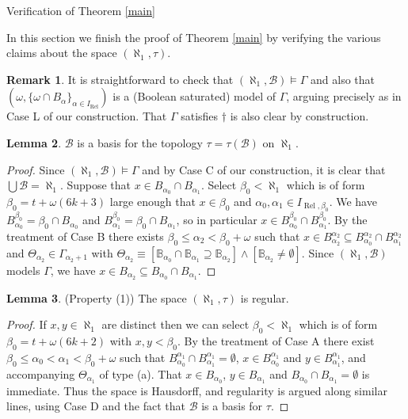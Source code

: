 \documentclass{amsart}
\theoremstyle{definition}\newtheorem{theorem}{Theorem}
\theoremstyle{definition}\newtheorem{bigtheorem}{Theorem}
\numberwithin{theorem}{section}
\theoremstyle{definition}\newtheorem{corollary}[theorem]{Corollary}
\theoremstyle{definition}\newtheorem{proposition}[theorem]{Proposition}
\theoremstyle{definition}\newtheorem{definition}[theorem]{Definition}
\theoremstyle{definition}\newtheorem{question}[theorem]{Question}
\theoremstyle{definition}\newtheorem{example}[theorem]{Example}
\theoremstyle{definition}\newtheorem{remark}[theorem]{Remark}
\theoremstyle{definition}\newtheorem{note}[theorem]{Note}
\theoremstyle{definition}\newtheorem{lemma}[theorem]{Lemma}
\theoremstyle{definition}\newtheorem{fact}[theorem]{Fact}
\theoremstyle{definition}\newtheorem{define}[theorem]{Definition}
\theoremstyle{definition}\newtheorem{definitions}[theorem]{Definitions}
\theoremstyle{definition}\newtheorem{claim}[theorem]{Claim}
\theoremstyle{definition}\newtheorem{obs}[theorem]{Observation}
\theoremstyle{definition}\newtheorem{construction}[theorem]{Construction}
\newcommand{\B}{\mathbb{B}}
\newcommand{\Rel}{\operatorname{Rel}}
\newcommand{\Bo}{\mathcal{B}}
\begin{document}
\begin{section}{Verification of Theorem \ref{main}}\label{verification}



In this section we finish the proof of Theorem \ref{main} by verifying the various claims about the space $(\aleph_1, \tau)$.  

\begin{remark}\label{modelindeed}  It is straightforward to check that $(\aleph_1, \Bo) \models \Gamma$ and also that $(\omega, \{\omega \cap B_{\alpha}\}_{\alpha \in I_{\Rel}})$ is a (Boolean saturated) model of $\Gamma$, arguing precisely as in Case L of our construction.  That $\Gamma$ satisfies $\dagger$ is also clear by construction.
\end{remark}

\begin{lemma}\label{basisindeed}  $\Bo$ is a basis for the topology $\tau = \tau(\Bo)$ on $\aleph_1$.  
\end{lemma}

\begin{proof}  Since $(\aleph_1, \Bo) \models \Gamma$ and by Case C of our construction, it is clear that $\bigcup \Bo = \aleph_1$. Suppose that $x \in B_{\alpha_0} \cap B_{\alpha_1}$.  Select $\beta_0 < \aleph_1$ which is of form $\beta_0 = t + \omega(6k + 3)$ large enough that $x \in \beta_0$ and $\alpha_0, \alpha_1 \in  I_{\Rel, \beta_0}$.  We have $B_{\alpha_0}^{\beta_0} = \beta_0 \cap B_{\alpha_0}$ and $B_{\alpha_1}^{\beta_0} = \beta_0 \cap B_{\alpha_1}$, so in particular $x\in  B_{\alpha_0}^{\beta_0} \cap B_{\alpha_1}^{\beta_0}$.  By the treatment of Case B there exists $\beta_0 \leq \alpha_2 < \beta_0 + \omega$ such that $x \in B_{\alpha_2}^{\alpha_2} \subseteq B_{\alpha_0}^{\alpha_2} \cap B_{\alpha_1}^{\alpha_2}$ and $\Theta_{\alpha_2}\in \Gamma_{\alpha_2 + 1}$ with $\Theta_{\alpha_2} \equiv [\B_{\alpha_0} \cap \B_{\alpha_1} \supseteq \B_{\alpha_2}]\wedge [\B_{\alpha_2} \neq \emptyset]$.  Since $(\aleph_1, \Bo)$ models $\Gamma$, we have $x\in B_{\alpha_2} \subseteq B_{\alpha_0}\cap B_{\alpha_1}$.
\end{proof}

\begin{lemma}\label{regularindeed}(Property (1))  The space $(\aleph_1, \tau)$ is regular.
\end{lemma}

\begin{proof}  If $x, y \in \aleph_1$ are distinct then we can select $\beta_0 < \aleph_1$ which is of form $\beta_0 = t + \omega(6k + 2)$ with $x, y < \beta_0$.  By the treatment of Case A there exist $\beta_0 \leq \alpha_0 < \alpha_1 <\beta_0 + \omega$ such that $B_{\alpha_0}^{\alpha_1} \cap B_{\alpha_1}^{\alpha_1} = \emptyset$, $x\in B_{\alpha_0}^{\alpha_1}$ and $y\in B_{\alpha_1}^{\alpha_1}$, and accompanying $\Theta_{\alpha_1}$ of type (a).  That $x \in B_{\alpha_0}$, $y \in B_{\alpha_1}$ and $B_{\alpha_0} \cap B_{\alpha_1} = \emptyset$ is immediate.  Thus the space is Hausdorff, and regularity is argued along similar lines, using Case D and the fact that $\Bo$ is a basis for $\tau$.
\end{proof}


\end{section}
\end{document}
